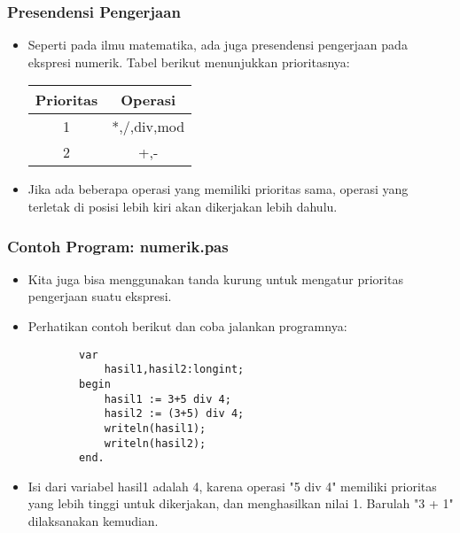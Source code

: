 \documentclass{beamer}
\begin{document}
\begin{frame}
\frametitle{Presendensi Pengerjaan}
\begin{itemize}
	\item Seperti pada ilmu matematika, ada juga presendensi pengerjaan pada ekspresi numerik. Tabel berikut menunjukkan prioritasnya:
	
	\begin{tabular}{|c|c|}
	\hline Prioritas & Operasi \\ 
	\hline 1 & *,/,div,mod \\ 
	\hline 2 & +,- \\ 
	\hline 
	\end{tabular} 
	\item Jika ada beberapa operasi yang memiliki prioritas sama, operasi yang terletak di posisi lebih kiri akan dikerjakan lebih dahulu.
\end{itemize}
\end{frame}

\begin{frame}[fragile]
\frametitle{Contoh Program: numerik.pas}
\begin{itemize}
	\item Kita juga bisa menggunakan tanda kurung untuk mengatur prioritas pengerjaan suatu ekspresi.
	\item Perhatikan contoh berikut dan coba jalankan programnya:
	\begin{lstlisting}
		var
		    hasil1,hasil2:longint;
		begin
		    hasil1 := 3+5 div 4;
		    hasil2 := (3+5) div 4;
		    writeln(hasil1);
		    writeln(hasil2);
		end.
	\end{lstlisting}
	\item Isi dari variabel hasil1 adalah 4, karena operasi "5 div 4" memiliki prioritas yang lebih tinggi untuk dikerjakan, dan menghasilkan nilai 1. Barulah "3 + 1" dilaksanakan kemudian. 
\end{itemize}
\end{frame}
\end{document}
